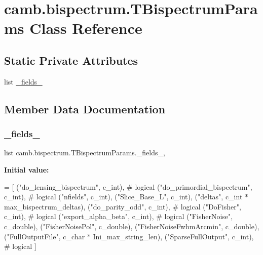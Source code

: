 \hypertarget{classcamb_1_1bispectrum_1_1TBispectrumParams}{}\section{camb.\+bispectrum.\+T\+Bispectrum\+Params Class Reference}
\label{classcamb_1_1bispectrum_1_1TBispectrumParams}
\subsection*{Static Private Attributes}
\begin{DoxyCompactItemize}
\item 
list \mbox{\hyperlink{classcamb_1_1bispectrum_1_1TBispectrumParams_ad7e29f987c3b8e021d9de8864a053fc2}{\+\_\+fields\+\_\+}}
\end{DoxyCompactItemize}


\subsection{Member Data Documentation}
\mbox{\label{classcamb_1_1bispectrum_1_1TBispectrumParams_ad7e29f987c3b8e021d9de8864a053fc2}} 
\subsubsection{\texorpdfstring{\+\_\+fields\+\_\+}{\_fields\_}}
{\footnotesize\ttfamily list camb.\+bispectrum.\+T\+Bispectrum\+Params.\+\_\+fields\+\_\+\hspace{0.3cm}{\ttfamily [static]}, {\ttfamily [private]}}

{\bfseries Initial value\+:}
\begin{DoxyCode}
=  [
        (\textcolor{stringliteral}{"do\_lensing\_bispectrum"}, c\_int),  \textcolor{comment}{# logical}
        (\textcolor{stringliteral}{"do\_primordial\_bispectrum"}, c\_int),  \textcolor{comment}{# logical}
        (\textcolor{stringliteral}{"nfields"}, c\_int),
        (\textcolor{stringliteral}{"Slice\_Base\_L"}, c\_int),
        (\textcolor{stringliteral}{"deltas"}, c\_int * max\_bispectrum\_deltas),
        (\textcolor{stringliteral}{"do\_parity\_odd"}, c\_int),  \textcolor{comment}{# logical}
        (\textcolor{stringliteral}{"DoFisher"}, c\_int),  \textcolor{comment}{# logical}
        (\textcolor{stringliteral}{"export\_alpha\_beta"}, c\_int),  \textcolor{comment}{# logical}
        (\textcolor{stringliteral}{"FisherNoise"}, c\_double),
        (\textcolor{stringliteral}{"FisherNoisePol"}, c\_double),
        (\textcolor{stringliteral}{"FisherNoiseFwhmArcmin"}, c\_double),
        (\textcolor{stringliteral}{"FullOutputFile"}, c\_char * Ini\_max\_string\_len),
        (\textcolor{stringliteral}{"SparseFullOutput"}, c\_int),  \textcolor{comment}{# logical}
    ]
\end{DoxyCode}



